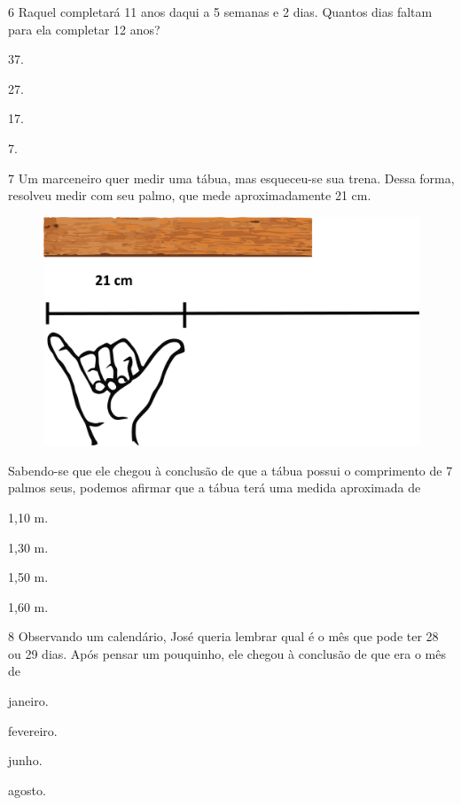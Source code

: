 \num{6} Raquel completará 11 anos daqui a 5 semanas e 2 dias. Quantos dias faltam para ela completar 12 anos?

\begin{multicols}{2}
\begin{escolha}
\item
  37.
\item
  27.
\item
  17.
\item
  7.
\end{escolha}
\end{multicols}

\num{7} Um marceneiro quer medir uma tábua, mas esqueceu-se sua trena. Dessa forma, resolveu medir com seu palmo, que mede aproximadamente 21 cm.

\begin{figure}[htpb!]
\centering
\includegraphics[width=.5\textwidth]{./media/image104.png}
\end{figure}

Sabendo-se que ele chegou à conclusão de que a tábua possui o comprimento de 7 palmos seus, podemos afirmar que a tábua terá uma medida aproximada de

\begin{multicols}{2}
\begin{escolha}
\item
  1,10 m.
\item
  1,30 m.
\item
  1,50 m.
\item
  1,60 m.
\end{escolha}
\end{multicols}

\num{8} Observando um calendário, José queria lembrar qual é o mês que pode ter 28 ou 29 dias. Após pensar um pouquinho, ele chegou à conclusão de que era o mês de

\begin{escolha}
\item
  janeiro.
\item
  fevereiro.
\item
  junho.
\item
  agosto.
\end{escolha}

